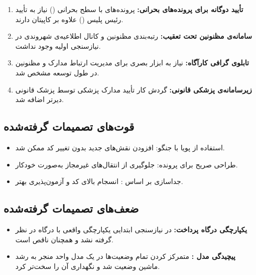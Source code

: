 \documentclass[12pt]{article} %
\theoremstyle{definition}
\begin{document}
\begin{enumerate}[rightmargin=1cm]
  \item \textbf{تأیید دوگانه برای پرونده‌های بحرانی:} پرونده‌های با سطح بحرانی () نیاز به تأیید رئیس پلیس () علاوه بر کاپیتان دارند.
  \item \textbf{سامانه‌ی مظنونین تحت تعقیب:} رتبه‌بندی مظنونین و کانال اطلاعیه‌ی شهروندی در نیازسنجی اولیه وجود نداشت.
  \item \textbf{تابلوی گرافی کارآگاه:} نیاز به ابزار بصری برای مدیریت ارتباط مدارک و مظنونین در طول توسعه مشخص شد.
  \item \textbf{زیرسامانه‌ی پزشکی قانونی:} گردش کار تأیید مدارک پزشکی توسط پزشک قانونی دیرتر اضافه شد.
\end{enumerate}

\subsection{قوت‌های تصمیمات گرفته‌شده}

\begin{itemize}[rightmargin=1cm]
  \item استفاده از  پویا با  جنگو: افزودن نقش‌های جدید بدون تغییر کد ممکن شد.
  \item طراحی  صریح برای پرونده: جلوگیری از انتقال‌های غیرمجاز به‌صورت خودکار.
  \item جداسازی  بر اساس : انسجام بالای کد و آزمون‌پذیری بهتر.
\end{itemize}

\subsection{ضعف‌های تصمیمات گرفته‌شده}

\begin{itemize}[rightmargin=1cm]
  \item \textbf{یکپارچگی درگاه پرداخت:} در نیازسنجی ابتدایی یکپارچگی واقعی با درگاه در نظر گرفته نشد و همچنان ناقص است.
  \item \textbf{پیچیدگی مدل :} متمرکز کردن تمام وضعیت‌ها در یک مدل واحد منجر به رشد ماشین وضعیت شد و نگهداری آن را سخت‌تر کرد.
\end{itemize}
\end{document}

